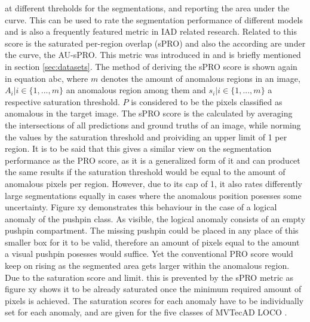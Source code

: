 at different threholds for the segmentations, and reporting the area under the curve. This can be 
used to rate the segmentation performance of different models and is also a frequently featured metric in IAD related research. 
Related to this score is the saturated per-region overlap (sPRO) and also the according are under the curve, the AU-sPRO. This metric was 
introduced in \cite{LOCODentsAndScratchesBergmann2022} and is briefly mentioned in section \ref{sec:datasets}. The method of deriving the sPRO 
score is shown again in equation abc, where $m$ denotes the amount of anomalous regions in an image, $A_i | i \in \{1, ... , m\}$ an anomalous 
region among them and $s_i | i \in \{1, ... , m\}$ a respective saturation threshold. $P$ is considered to be the pixels classified as anomalous 
in the target image. The sPRO score is the calculated by averaging the intersections of all predictions and ground truths of an image, 
while norming the values by the saturation threshold and proividing an upper limit of 1 per region. It is to be said that this gives a similar 
view on the segmentation performance as the PRO score, as it is a generalized form of it and can producet the same results if the saturation 
threshold would be equal to the amount of anomalous pixels per region. However, due to its cap of 1, it also rates differently large segmentations equally in cases 
where the anomalous position posesses some uncertainty. Figure xy demonstrates this behaviour in the case of a logical anomaly of the pushpin class. 
As visible, the logical anomaly consists of an empty pushpin compartment. The missing pushpin could be placed in any place of this smaller 
box for it to be valid, therefore an amount of pixels equal to the amount a visual pushpin posesses would suffice. Yet the conventional PRO score 
would keep on rising as the segmented area gets larger within the anomalous region. Due to the saturation score and limit. this is prevented 
by the sPRO metric as figure xy shows it to be already saturated once the minimum required amount of pixels is achieved. The saturation 
scores for each anomaly have to be individually set for each anomaly, and are given for the five classes of MVTecAD LOCO \cite{LOCODentsAndScratchesBergmann2022}.





